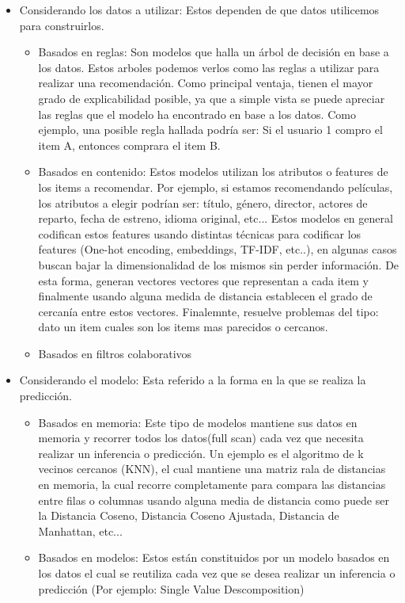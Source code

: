 \documentclass[11pt,a4paper]{tesis}
\begin{document}
\begin{itemize}
\item Considerando los datos a utilizar: Estos dependen de que datos utilicemos para construirlos.
	\begin{itemize}
	\item Basados en reglas: Son modelos que halla un árbol de decisión en base a los datos. Estos arboles podemos verlos como las reglas a utilizar para realizar una recomendación. Como principal ventaja, tienen el mayor grado de explicabilidad posible,  ya que a simple vista se puede apreciar las reglas que el modelo ha encontrado en base a los datos. Como ejemplo, una posible regla hallada podría ser: Si el usuario 1 compro el item A, entonces comprara el item B.
	\item Basados en contenido:  Estos modelos utilizan los atributos o features de los items a recomendar. Por ejemplo, si estamos recomendando películas, los atributos a elegir podrían ser: título, género, director, actores de reparto, fecha de estreno, idioma original, etc... Estos modelos  en general codifican estos features usando distintas técnicas para codificar los features (One-hot encoding, embeddings, TF-IDF, etc..), en algunas casos buscan bajar la dimensionalidad de los mismos sin perder información. De esta forma, generan vectores vectores que representan a cada item y finalmente usando alguna medida de distancia establecen el grado de cercanía entre estos vectores. Finalemnte, resuelve problemas del tipo: dato un item cuales son los items mas parecidos o cercanos.
	\item Basados en filtros colaborativos
	\end{itemize}
\item Considerando el modelo: Esta referido a la forma en la que se realiza la predicción.
	\begin{itemize}
	\item Basados en memoria: Este tipo de modelos mantiene sus datos en memoria y recorrer todos los datos(full scan) cada vez que necesita realizar un inferencia o predicción. Un ejemplo es el algoritmo de k vecinos cercanos (KNN), el cual mantiene una matriz rala de distancias en memoria, la cual recorre completamente para compara las distancias entre filas o columnas usando alguna media de distancia como puede ser la Distancia Coseno, Distancia Coseno Ajustada, Distancia de Manhattan, etc...
	\item Basados en modelos:  Estos están constituidos por un modelo basados en los datos el cual se reutiliza cada vez que se desea realizar un inferencia o predicción (Por ejemplo: Single Value Descomposition)
	\end{itemize}
\end{itemize}
\end{document}

